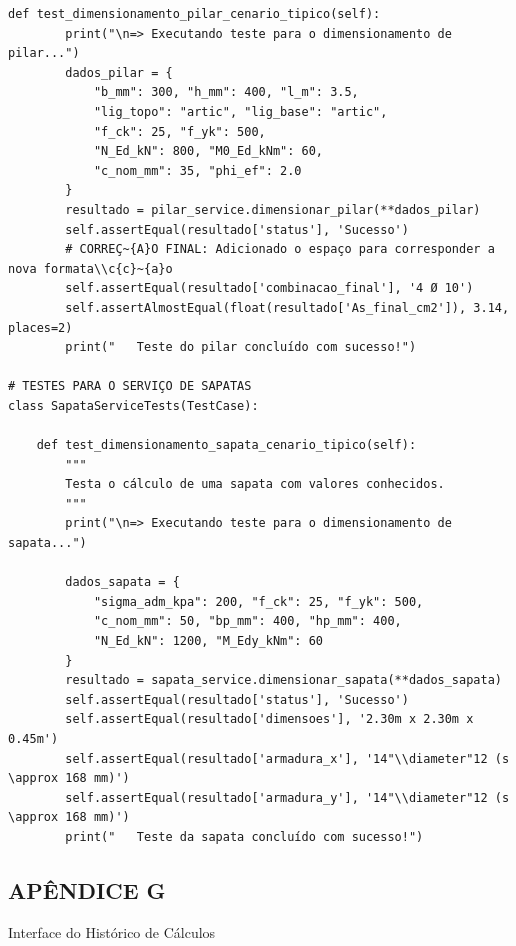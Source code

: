 \begin{lstlisting}[style=PythonStyle, basicstyle=\ttfamily\normalsize, caption={Testes Unitários Automatizados (calculos/tests.py)}, label={lst:tests_py}]
    def test_dimensionamento_pilar_cenario_tipico(self):
        print("\n=> Executando teste para o dimensionamento de pilar...")
        dados_pilar = {
            "b_mm": 300, "h_mm": 400, "l_m": 3.5,
            "lig_topo": "artic", "lig_base": "artic",
            "f_ck": 25, "f_yk": 500,
            "N_Ed_kN": 800, "M0_Ed_kNm": 60,
            "c_nom_mm": 35, "phi_ef": 2.0
        }
        resultado = pilar_service.dimensionar_pilar(**dados_pilar)
        self.assertEqual(resultado['status'], 'Sucesso')
        # CORREÇ~{A}O FINAL: Adicionado o espaço para corresponder a nova formata\\c{c}~{a}o
        self.assertEqual(resultado['combinacao_final'], '4 Ø 10')
        self.assertAlmostEqual(float(resultado['As_final_cm2']), 3.14, places=2)
        print("   Teste do pilar concluído com sucesso!")

# TESTES PARA O SERVIÇO DE SAPATAS
class SapataServiceTests(TestCase):

    def test_dimensionamento_sapata_cenario_tipico(self):
        """
        Testa o cálculo de uma sapata com valores conhecidos.
        """
        print("\n=> Executando teste para o dimensionamento de sapata...")

        dados_sapata = {
            "sigma_adm_kpa": 200, "f_ck": 25, "f_yk": 500,
            "c_nom_mm": 50, "bp_mm": 400, "hp_mm": 400,
            "N_Ed_kN": 1200, "M_Edy_kNm": 60
        }
        resultado = sapata_service.dimensionar_sapata(**dados_sapata)
        self.assertEqual(resultado['status'], 'Sucesso')
        self.assertEqual(resultado['dimensoes'], '2.30m x 2.30m x 0.45m')
        self.assertEqual(resultado['armadura_x'], '14"\\diameter"12 (s \approx 168 mm)')
        self.assertEqual(resultado['armadura_y'], '14"\\diameter"12 (s \approx 168 mm)')
        print("   Teste da sapata concluído com sucesso!")
\end{lstlisting}

\newpage
{}
\begin{center}
\section*{APÊNDICE G}
Interface do Histórico de Cálculos
\end{center}


